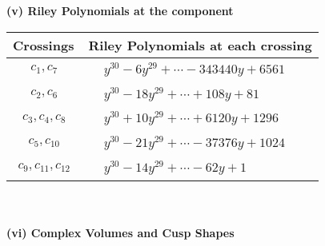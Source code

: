 \documentclass[1p]{elsarticle_modified}
\theoremstyle{definition}
\begin{document}
\newpage\renewcommand{\arraystretch}{1}
\flushleft \textbf{(v) Riley Polynomials at the component}\newline \\
\begin{tabular}{m{50pt}|m{274pt}}
Crossings & \hspace{64pt}Riley Polynomials at each crossing \\
\hline $$\begin{aligned}c_{1},c_{7}\end{aligned}$$&$\begin{aligned}
&y^{30}-6 y^{29}+\cdots-343440 y+6561
\end{aligned}$\\
\hline $$\begin{aligned}c_{2},c_{6}\end{aligned}$$&$\begin{aligned}
&y^{30}-18 y^{29}+\cdots+108 y+81
\end{aligned}$\\
\hline $$\begin{aligned}c_{3},c_{4},c_{8}\end{aligned}$$&$\begin{aligned}
&y^{30}+10 y^{29}+\cdots+6120 y+1296
\end{aligned}$\\
\hline $$\begin{aligned}c_{5},c_{10}\end{aligned}$$&$\begin{aligned}
&y^{30}-21 y^{29}+\cdots-37376 y+1024
\end{aligned}$\\
\hline $$\begin{aligned}c_{9},c_{11},c_{12}\end{aligned}$$&$\begin{aligned}
&y^{30}-14 y^{29}+\cdots-62 y+1
\end{aligned}$\\
\hline
\end{tabular}\\~\\
\newpage\flushleft \textbf{(vi) Complex Volumes and Cusp Shapes}
\end{document}
